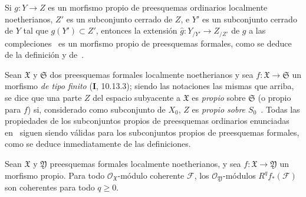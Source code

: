 \begin{env}[3.4.1]
Si $g:Y\to Z$ es un morfismo propio de preesquemas ordinarios localmente noetherianos, $Z'$ es un subconjunto cerrado de $Z$, e $Y'$ es un subconjunto cerrado de $Y$ tal que $g(Y')\subset Z'$, entonces la extensión $\widehat g:Y_{/Y'}\to Z_{/Z'}$ de $g$ a las compleciones~ es un morfismo propio de preesquemas formales, como se deduce de la definición y de~.

Sean $\mathfrak X$ y $\mathfrak S$ dos preesquemas formales localmente noetherianos y sea $f:\mathfrak X\to\mathfrak S$ un morfismo \emph{de tipo finito} (\textbf{I}, 10.13.3); siendo las notaciones las mismas que arriba, se dice que una parte $Z$ del espacio subyacente a $\mathfrak X$ es \emph{propio} sobre $\mathfrak S$ (o propio para $f$) si, considerado como subconjunto de $X_0$, $Z$ es \emph{propio sobre $S_0$}~.
Todas las propiedades de los subconjuntos propios de preesquemas ordinarios enunciadas en~ siguen siendo válidas para los subconjuntos propios de preesquemas formales, como se deduce inmediatamente de las definiciones.
\end{env}

\begin{theorem}[3.4.2]
\label{III.3.4.2}
\label{III.3.4.2-fr}
Sean $\mathfrak X$ y $\mathfrak Y$ preesquemas formales localmente noetherianos, y sea $f:\mathfrak X\to\mathfrak Y$ un morfismo propio.
Para todo $\mathcal O_{\mathfrak X}$-módulo coherente $\mathcal F$, los $\mathcal O_{\mathfrak Y}$-módulos $R^qf_*(\mathcal F)$ son coherentes para todo $q\geq0$.
\end{theorem}

